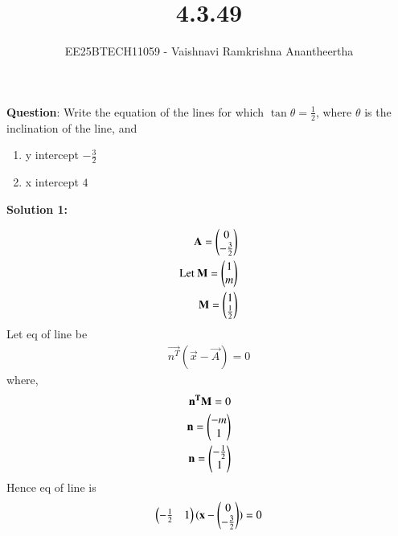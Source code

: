 \documentclass[journal]{IEEEtran}
\title{4.3.49}
\author{EE25BTECH11059 - Vaishnavi Ramkrishna Anantheertha}
\begin{document}
\maketitle

\renewcommand{\thefigure}{\theenumi}
\renewcommand{\thetable}{\theenumi}


\textbf{Question}:
Write the equation of the lines for which $\tan\theta = \frac{1}{2}$, where $\theta$ is the inclination of the line, and
\begin{enumerate}
\item[(a)] y intercept $- \frac{3}{2}$
\item[(b)] x intercept $4$
\end{enumerate}
\textbf{Solution 1: }
\begin{table}[H]    
  \centering
  
  \caption{Variables Used}
  \label{tab:4.3.49}
\end{table}
\begin{align}
\mathbf{A}=\begin{pmatrix}
                0
                \\
                 -\frac{3}{2}  \end{pmatrix}\\
\text{Let }\mathbf{M}=\begin{pmatrix}
                           1
                           \\
                            m
                            \end{pmatrix}\\
            \mathbf{M}=\begin{pmatrix}
                           1
                           \\
                            \frac{1}{2}
                            \end{pmatrix}
\end{align}
Let eq of line be
\begin{align}
\vec{n^T}(\vec{x}-\vec{A})=0
\end{align}
where,
\begin{align}
\mathbf{n^T}\mathbf{M}=0\\
\mathbf{n}=\begin{pmatrix}-m
               \\
               1\end{pmatrix}\\
\mathbf{n}=\begin{pmatrix}-\frac{1}{2}
                \\
                1\end{pmatrix}
\end{align}
Hence eq of line is
\begin{align}
\begin{pmatrix}-\frac{1}{2}&1\end{pmatrix}
(\mathbf{x}-    
\begin{pmatrix}
           0
           \\
            -\frac{3}{2}
               \end{pmatrix}   )
=0
\end{align}
\end{document}
